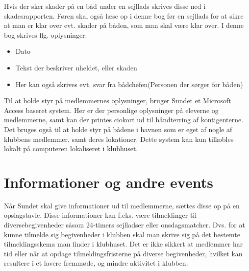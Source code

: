 Hvis der sker skader på en båd under en sejllads skrives disse ned i skadesrapporten. Føren skal også læse op i denne bog før en sejllads for at sikre at man er klar over evt. skader på båden, som man skal være klar over. I denne bog skrives flg. oplysninger:

\begin{itemize}
	\item Dato
	\item Tekst der beskriver uheldet, eller skaden
	\item Her kan også skrives evt. svar fra bådchefen(Personen der sørger for båden)
\end{itemize}

Til at holde styr på medlemmernes oplysninger, bruger Sundet et Microsoft Access baseret system. Her er der personlige oplysninger på eleverne og medlemmerne, samt kan der printes ciokort ud til håndterring af kontigenterne. Det bruges også til at holde styr på bådene i havnen som er eget af nogle af klubbens medlemmer, samt deres lokationer. Dette system kan kun tilkobles lokalt på computeren lokaliseret i klubhuset.

\section{Informationer og andre events}

Når Sundet skal give informationer ud til medlemmerne, sættes disse op på en opslagstavle. Disse informationer kan f.eks. være tilmeldinger til diversebegivenheder såsom 24-timers sejlladser eller onsdagsmatcher. Dvs. for at kunne tilmelde sig begivenheder i klubben skal man skrive sig på det bestemte tilmeldingsskema man finder i klubhuset. Det er ikke sikkert at medlemmer har tid eller når at opdage tilmeldingsfristerne på diverse begivenheder, hvilket kan resultere i et lavere fremmøde, og mindre aktivitet i klubben.
